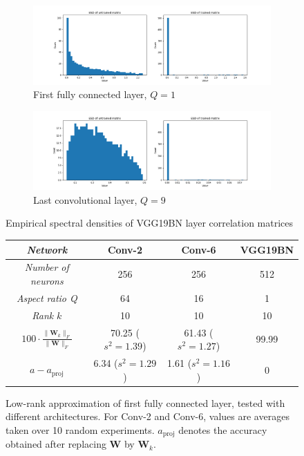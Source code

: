 \begin{figure}[H]
\centering
\begin{subfigure}[b]{\textwidth}
   \includegraphics[width=1\linewidth]{images/vgg-fc1-svd-comp.png}
   \caption{First fully connected layer, $Q = 1$}
   \label{fig:vgg-conv16-svd-comp}
\end{subfigure}

\begin{subfigure}[b]{\textwidth}
   \includegraphics[width=1\linewidth]{images/vgg-conv16-svd-comp.png}
   \caption{Last convolutional layer, $Q = 9$}
   \label{fig:vgg-conv16-svd-comp} 
\end{subfigure}
\caption{Empirical spectral densities of VGG19BN layer correlation matrices}
\end{figure}

\begin{figure}[h]
\centering
\scalebox{0.9}
{\begin{tabular}{SSSS} \toprule
    {\textit{Network}} & {Conv-2} & {Conv-6} & {VGG19BN} \\ \midrule
	{\textit{Number of neurons}} & {256} & {256} & {512} \\    
    {\textit{Aspect ratio Q}} & {64} & {16} & {1} \\
    {\textit{Rank} $k$} & {10} & {10} & {10} \\
    {$100 \cdot \frac{ \| \mathbf{W}_k \|_F }{ \| \mathbf{W} \|_F }$}  & {70.25 ($s^2 = 1.39$)} & {61.43  ($s^2 = 1.27$)} & {99.99} \\
    {$a - a_{\text{proj}}$}  & {6.34 ($s^2 = 1.29$)} & {1.61  ($s^2 = 1.16$)} & {0} \\ \bottomrule
\end{tabular}}
\caption{Low-rank approximation of first fully connected layer, tested with different architectures. For Conv-2 and Conv-6, values are averages taken over 10 random experiments. $a_{\text{proj}}$ denotes the accuracy obtained after replacing $\mathbf{W}$ by $\mathbf{W}_k$.}
\label{fig:low-rank}
\end{figure}

